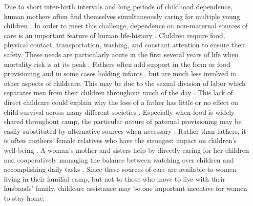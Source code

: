 \documentclass[smallextended]{svjour3}       %
\begin{document}
Due to short inter-birth intervals and long periods of childhood dependence, human mothers often find themselves simultaneously caring for multiple young children \cite{key2000evolution}.  In order to meet this challenge, dependence on non-maternal sources of care is an important feature of human life-history \cite{hawkes1998grandmothering, kaplan2000theory}.  Children require food, physical contact, transportation, washing, and constant attention to ensure their safety.  These needs are particularly acute in the first several years of life when mortality risk is at its peak \cite{hill1996ache}.  Fathers often add support in the form or food provisioning and in some cases holding infants \cite{marlowe2003critical, crittenden2008allomaternal}, but are much less involved in other aspects of childcare.  This may be due to the sexual division of labor which separates men from their children throughout much of the day \cite{hewlett1992father}.  This lack of direct childcare could explain why the loss of a father has little or no effect on child survival across many different societies \cite{sear2008keeps}.  Especially when food is widely shared throughout camp, the particular nature of paternal provisioning may be easily substituted by alternative sources when necessary \cite{sugiyama2005juvenile, kaplan1984food, hawkes2001hadza}.  Rather than fathers, it is often mothers' female relatives who have the strongest impact on children's well-being \cite{sear2008keeps}.  A woman's mother and sisters help by directly caring for her children and cooperatively managing the balance between watching over children and accomplishing daily tasks \cite{valeggia2009changing, henry2005child, crittenden2008allomaternal, hawkes1997hadza}.  Since these sources of care are available to women living in their familial camp, but not to those who move to live with their husbands' family, childcare assistance may be one important incentive for women to stay home.  
\end{document}
